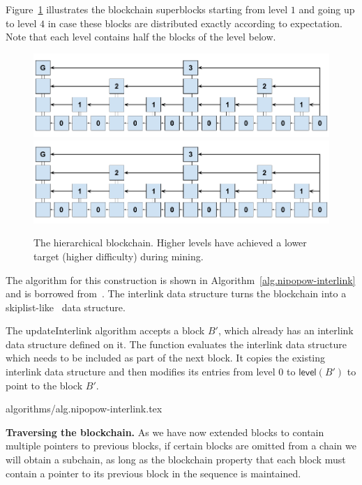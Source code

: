 Figure~\ref{fig.hierarchy} illustrates the blockchain superblocks starting from
level $1$ and going up to level $4$ in case these blocks are distributed
exactly according to expectation. Note that each level contains half the blocks
of the level below.

\begin{figure}
    \caption{The hierarchical blockchain.
    Higher levels have achieved a lower target (higher difficulty) during mining.}
    \centering
    \iftwocolumn
        \includegraphics[width=0.9\columnwidth,keepaspectratio]{figures/hierarchical-ledger.png}
    \else
        \includegraphics[width=0.7\columnwidth,keepaspectratio]{figures/hierarchical-ledger.png}
    \fi
    \label{fig.hierarchy}
\end{figure}

The algorithm for this construction is shown in
Algorithm~\ref{alg.nipopow-interlink} and is borrowed from~\cite{KLS}. The
interlink data structure turns the blockchain into a
skiplist-like~\cite{skiplist} data structure.

The updateInterlink algorithm accepts a block $B'$, which already has an
interlink data structure defined on it. The function evaluates the
interlink data structure which needs to be included as part of the next block.
It copies the existing interlink data structure and
then modifies its entries from level $0$ to $\textsf{level}(B')$ to
point to the block $B'$.

{algorithms/alg.nipopow-interlink.tex}

\noindent\textbf{Traversing the blockchain. }
As we have now extended blocks to contain multiple pointers to previous blocks,
if certain blocks are omitted from a chain we will obtain a subchain, as long as
the blockchain property that each block must contain a pointer to its previous
block in the sequence is maintained.

